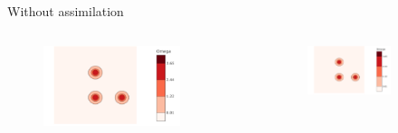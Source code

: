 \documentclass[aspectratio=169]{beamer} %
\begin{document}
\begin{frame}{Without assimilation}
    \begin{columns}
        \begin{column}{0.5\textwidth}
            \begin{figure}
                \centering
                \includegraphics[width=\textwidth]{images/vorticity_field.png}
            \end{figure}
        \end{column}
        \begin{column}{0.6\textwidth}
            \begin{figure}
                \centering
                \begin{subfigure}{\textwidth}
                    \centering
                    \includegraphics[width=\textwidth]{images/vorticity_field.png}
                \end{subfigure}
                \begin{subfigure}{\textwidth}

\end{subfigure}
\end{figure}
\end{column}
\end{columns}
\end{frame}
\end{document}
